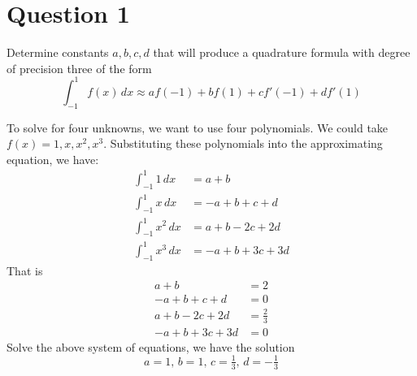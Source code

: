 \section{Question 1}

\begin{question}
    Determine constants $a,b,c,d$ that will produce a quadrature formula with degree of precision three of the form 
    \begin{equation}
        \int_{-1}^1 f(x) \, dx \approx af(-1)+bf(1)+cf'(-1)+df'(1)
    \end{equation}
\end{question}

\begin{answer}
    To solve for four unknowns, we want to use four polynomials. We could take $f(x) = 1, x, x^2, x^3$. Substituting these polynomials into the approximating equation, we have:
    \begin{align}
        \int_{-1}^1 1 \, dx &= a + b\\
        \int_{-1}^1 x \, dx &= -a + b + c + d\\
        \int_{-1}^1 x^2 \, dx &= a + b - 2c + 2d\\
        \int_{-1}^1 x^3 \, dx &= -a + b + 3c + 3d
    \end{align}
    That is
    \begin{align}
        a + b &= 2\\
        -a + b + c + d &= 0\\
        a + b - 2c + 2d &= \tfrac{2}{3}\\
        -a + b + 3c + 3d &= 0
    \end{align}
    Solve the above system of equations, we have the solution
    \begin{equation}
        a = 1, \, b = 1, \, c = \tfrac{1}{3}, \, d = -\tfrac{1}{3}
    \end{equation}
\end{answer}